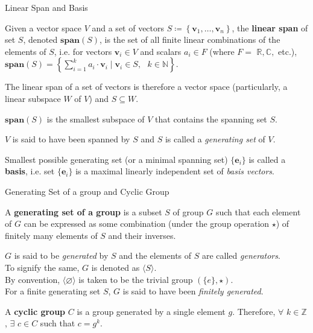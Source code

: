 \documentclass{beamer}
\newcommand\boldtext[1]{\textcolor{bolds}{\textbf{#1}}}
\newcommand\italictext[1]{\textcolor{italics}{\textit{#1}}}
\begin{document}
\begin{frame}{Linear Span and Basis}
    \begin{definition}
        Given a vector space $V$ and a set of vectors $S\coloneqq\left\{\mathbf{v}_1,\dots,\mathbf{v}_n\right\}$, the \boldtext{linear span} of set $S$, denoted $\mathbf{span}(S)$, is the set of all finite linear combinations of the elements of $S$, i.e. for vectors $\mathbf{v}_i \in {V}$ and scalars $a_i \in {F}$ (where $F=$ $\mathbb{R}, \mathbb{C},$ etc.), $\mathbf{span}(S)=\left\{\sum\limits_{i=1}^{k}a_i\cdot\mathbf{v}_i\mid\mathbf{v}_i \in {S},\text{ }k\in\mathbb{N}\right\}$.
    \end{definition}
    \vspace{-0.075em}
    The linear span of a set of vectors is therefore a vector space (particularly, a linear subspace $W$ of $V$) and $S\subseteq W$.
    \vspace{-0.075em}
    \begin{lemma}
        $\mathbf{span}(S)$ is the smallest subspace of $V$ that contains the spanning set $S$.
    \end{lemma}
    \vspace{-0.075em}
    $V$ is said to have been spanned by $S$ and $S$ is called a \italictext{generating set} of $V$.
    \begin{definition}
        Smallest possible generating set (or a minimal spanning set) $\{\mathbf{e}_i\}$ is called a \boldtext{basis}, i.e. set $\{\mathbf{e}_i\}$ is a maximal linearly independent set of \italictext{basis vectors}.
    \end{definition}
\end{frame}

\begin{frame}{Generating Set of a group and Cyclic Group}
    \begin{definition}
        A \boldtext{generating set of a group} is a subset $S$ of group $G$ such that each element of $G$ can be expressed as some combination (under the group operation $\star$) of finitely many elements of $S$ and their inverses.
    \end{definition}
    $G$ is said to be \italictext{generated} by $S$ and the elements of $S$ are called \italictext{generators}.\\
    To signify the same, $G$ is denoted as $\langle S\rangle$.\\
    By convention, $\langle\varnothing\rangle$ is taken to be the trivial group $(\{e\},\star)$.\\
    For a finite generating set $S$, $G$ is said to have been \italictext{finitely generated}.
    \begin{definition}
        A \boldtext{cyclic group} $C$ is a group generated by a single element $g$. Therefore, $\forall$ $k\in\mathbb{Z}$,  $\exists$ $c\in C$ such that $c=g^k$.
    \end{definition}
\end{frame}
\end{document}
